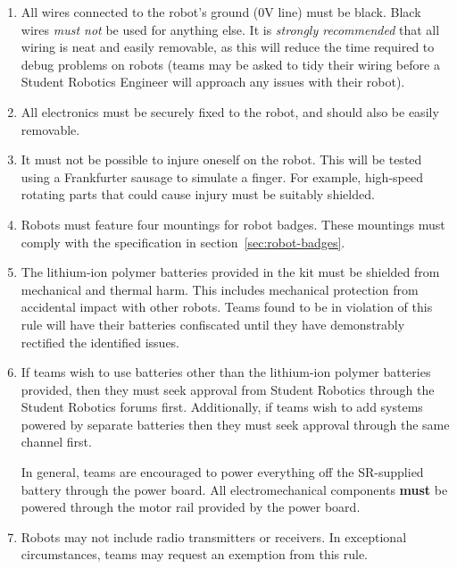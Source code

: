 \begin{enumerate}
\item All wires connected to the robot's ground (0V line) must be black.
      Black wires \emph{must not} be used for anything else.
      It is \emph{strongly recommended} that all wiring is neat and easily removable, as this will reduce the time required to debug problems on robots
       (teams may be asked to tidy their wiring before a Student Robotics Engineer will approach any issues with their robot).

\item All electronics must be securely fixed to the robot, and should also be easily removable.

\item It must not be possible to injure oneself on the robot.
      This will be tested using a Frankfurter sausage to simulate a finger.
      For example, high-speed rotating parts that could cause injury must be suitably shielded.

\item Robots must feature four mountings for robot badges.
      These mountings must comply with the specification in section~\ref{sec:robot-badges}.

\item The lithium-ion polymer batteries provided in the kit must be shielded from mechanical and thermal harm.
      This includes mechanical protection from accidental impact with other robots.
      Teams found to be in violation of this rule will have their batteries confiscated until they have demonstrably rectified the identified issues.

\item If teams wish to use batteries other than the lithium-ion polymer batteries provided,
       then they must seek approval from Student Robotics through the Student Robotics forums first.
      Additionally, if teams wish to add systems powered by separate batteries then they must seek approval through the same channel first.

      In general, teams are encouraged to power everything off the SR-supplied battery through the power board.
      All electromechanical components \textbf{must} be powered through the motor rail provided by the power board.

\item Robots may not include radio transmitters or receivers.
      In exceptional circumstances, teams may request an exemption from this rule.

\end{enumerate}
